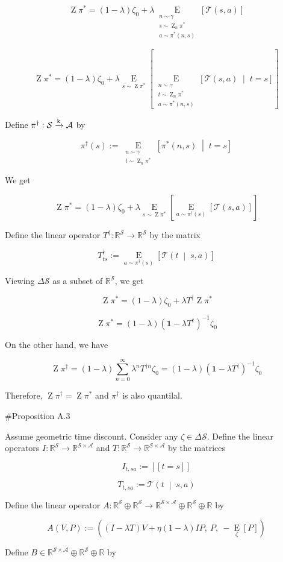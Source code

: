 \documentclass[a4paper]{article}
\newcommand{\AP}[1]{\left(#1\right)}
\newcommand{\AB}[1]{\left[#1\right]}
\newcommand{\APM}[2]{\left(#1\;\middle\vert\;#2\right)}
\newcommand{\ABM}[2]{\left[#1\;\middle\vert\;#2\right]}
\newcommand{\Ea}[2]{\underset{#1}{\operatorname{E}}\AB{#2}}
\newcommand{\CE}[3]{\underset{#1}{\operatorname{E}}\ABM{#2}{#3}}
\newcommand{\Reals}{\mathbb{R}}
\newcommand{\K}{\xrightarrow{\textnormal{k}}}
\newcommand{\A}{\mathcal{A}}
\newcommand{\St}{\mathcal{S}}
\newcommand{\T}{\mathcal{T}}
\DeclareMathOperator{\Z}{Z}
\begin{document}
$$\Z\pi^* = (1-\lambda)\zeta_0 + \lambda \Ea{\substack{n\sim\gamma\\s\sim\Z_n{\pi^*}\\a\sim\pi^*\AP{n,s}}}{\T(s,a)}$$

$$\Z\pi^* = (1-\lambda)\zeta_0 + \lambda \Ea{s\sim\Z\pi^*}{\CE{\substack{n\sim\gamma\\t\sim\Z_n\pi^*\\a\sim\pi^*(n,s)}}{\T(s,a)}{t=s}}$$

Define $\pi^\dagger: \St \K \A$ by

$$\pi^\dagger(s) := \CE{\substack{n\sim\gamma\\t\sim\Z_n\pi^*}}{\pi^*(n,s)}{t=s}$$

We get

$$\Z\pi^* = (1-\lambda)\zeta_0 + \lambda \Ea{s\sim\Z\pi^*}{\Ea{a\sim\pi^\dagger(s)}{\T(s,a)}}$$

Define the linear operator $T^\dagger: \Reals^\St \rightarrow \Reals^\St$ by the matrix 

$$T^\dagger_{ts} := \Ea{a\sim\pi^\dagger(s)}{\T\APM{t}{s,a}}$$

Viewing $\Delta\St$ as a subset of $\Reals^\St$, we get

$$\Z\pi^* = (1-\lambda)\zeta_0 + \lambda T^\dagger\Z\pi^*$$

$$\Z\pi^* = (1-\lambda)\AP{\boldsymbol{1}-\lambda T^\dagger}^{-1}\zeta_0$$

On the other hand, we have

$$\Z\pi^\dagger = (1-\lambda)\sum_{n=0}^\infty \lambda^n T^{\dagger n} \zeta_0 = (1-\lambda)\AP{\boldsymbol{1}-\lambda T^\dagger}^{-1}\zeta_0$$

Therefore, $\Z\pi^\dagger = \Z\pi^*$ and $\pi^\dagger$ is also quantilal.

\#Proposition A.3

Assume geometric time discount. Consider any $\zeta\in\Delta\St$. Define the linear operators $I: \Reals^\St \rightarrow \Reals^{\St\times\A}$ and $T: \Reals^\St \rightarrow \Reals^{\St\times\A}$ by the matrices

$$I_{t,sa}:=[[t=s]]$$

$$T_{t,sa}:=\T\APM{t}{s,a}$$

Define the linear operator $A: \Reals^\St \oplus \Reals^\St \rightarrow \Reals^{\St\times\A}\oplus\Reals^{\St}\oplus\Reals$ by

$$A(V,P):=\AP{\AP{I-\lambda T}V + \eta(1-\lambda)IP,\ P,\ -\Ea{\zeta}{P}}$$

Define $B\in \Reals^{\St\times\A}\oplus\Reals^{\St}\oplus\Reals$ by
\end{document}
